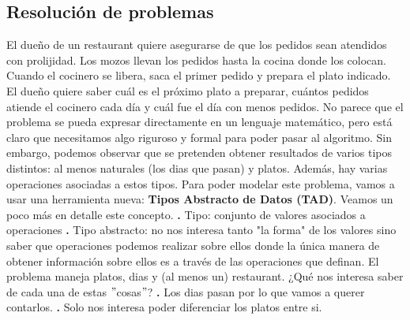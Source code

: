 \documentclass[10pt,a4paper]{article}
\begin{document}
\subsection{Resolución de problemas}

El dueño de un restaurant quiere asegurarse de que los pedidos sean atendidos con prolijidad. Los mozos llevan los pedidos hasta la cocina donde los colocan. Cuando el cocinero se libera, saca el primer pedido y prepara el plato indicado. El dueño quiere saber cuál es el próximo plato a preparar, cuántos pedidos atiende el cocinero cada día y cuál fue el día con menos pedidos.
\newline
\newline
No parece que el problema se pueda expresar directamente en un lenguaje matemático, pero está claro que necesitamos algo riguroso y formal para poder pasar al algoritmo. 
\newline
\newline
Sin embargo, podemos observar que se pretenden obtener resultados de varios tipos distintos: al menos naturales (los dias que pasan) y platos. Además, hay varias operaciones asociadas a estos tipos.
\newline
\newline
Para poder modelar este problema, vamos a usar una herramienta nueva: \textbf{Tipos Abstracto de Datos (TAD)}. Veamos un poco más en detalle este concepto.
\newline
\newline
\textbf{.} Tipo: conjunto de valores asociados a operaciones
\newline
\newline
\textbf{.} Tipo abstracto: no nos interesa tanto "la forma" de los valores sino saber que operaciones podemos realizar sobre ellos donde la única manera de obtener información sobre ellos es a través de las operaciones que definan.
\newline
\newline
El problema maneja platos, dias y (al menos un) restaurant.
\newline
\newline
¿Qué nos interesa saber de cada una de estas $"$cosas$"$?
\newline
\newline
\textbf{.} Los dias pasan por lo que vamos a querer contarlos.
\newline
\newline
\textbf{.} Solo nos interesa poder diferenciar los platos entre si.
\newline
\end{document}
